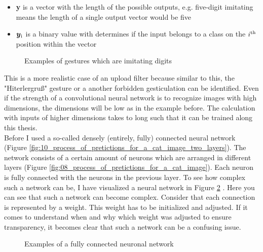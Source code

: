 \begin{itemize}
	\item \textbf{y} is a vector with the length of the possible outputs, e.g. five-digit imitating means the length of a single output vector would be five \\
	\item \(\boldsymbol{y\textsubscript{i}}\) is a binary value with determines if the input belongs to a class on the \(i\textsuperscript{th}\) position within the vector\\
\end{itemize}

\begin{figure}[htp]
	\centering
	\caption{Examples of gestures which are imitating digits}
	\label{fig:signs}
\end{figure}

This is a more realistic case  of an upload filter because similar to this, the "Hiterlergruß" gesture or a another forbidden gesticulation can be identified. Even if the strength of a convolutional neural network is to recognize images with high dimensions, the  dimensions will be low as in the example before. The calculation with inputs of higher dimensions takes to long such that it can be trained along this thesis. \cite{DBLP:journals/corr/TraskGR15}\\

Before I used a so-called densely (entirely, fully) connected neural network (Figure \ref{fig:10_process_of_pretictions_for_a_cat_image_two_layers}). The network consists of a certain amount of neurons which are arranged in different layers (Figure \ref{fig:08_process_of_pretictions_for_a_cat_image}). Each neuron is fully connected with the neurons in the previous layer. To see how complex such a network can be, I have visualized a neural network in Figure \ref{fig:signs} . Here you can see that such a network can become complex. Consider that each connection is represented by a weight. This weight has to be initialized and adjusted. If it comes to understand when and why which weight was adjusted to ensure transparency, it becomes clear that such a network can be a confusing issue. 

\begin{figure}[htp]
	\centering
	\caption{Examples of a fully connected neuronal network}
	\label{fig:signs}
\end{figure}

